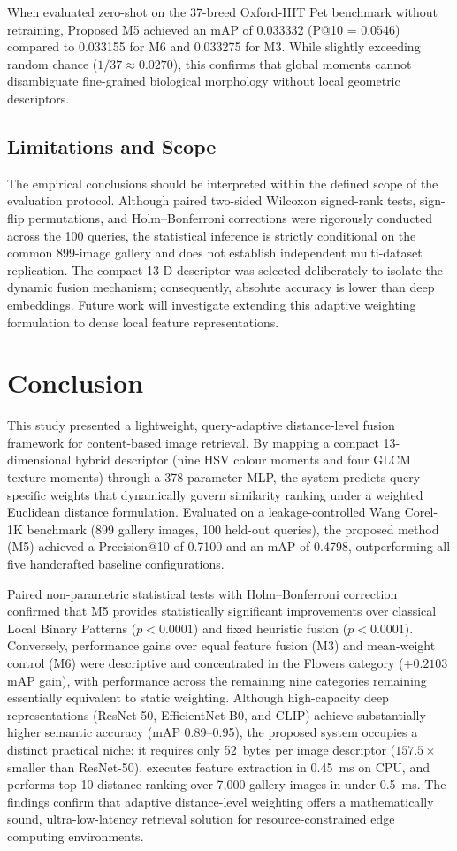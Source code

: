 \documentclass[pdflatex,sn-mathphys-num]{sn-jnl}
\begin{document}
When evaluated zero-shot on the 37-breed Oxford-IIIT Pet benchmark without retraining, Proposed M5 achieved an mAP of 0.033332 (P@10 = 0.0546) compared to 0.033155 for M6 and 0.033275 for M3. While slightly exceeding random chance ($1/37 \approx 0.0270$), this confirms that global moments cannot disambiguate fine-grained biological morphology without local geometric descriptors.

\subsection{Limitations and Scope}\label{subsec5.6}
The empirical conclusions should be interpreted within the defined scope of the evaluation protocol. Although paired two-sided Wilcoxon signed-rank tests, sign-flip permutations, and Holm--Bonferroni corrections were rigorously conducted across the 100 queries, the statistical inference is strictly conditional on the common 899-image gallery and does not establish independent multi-dataset replication. The compact 13-D descriptor was selected deliberately to isolate the dynamic fusion mechanism; consequently, absolute accuracy is lower than deep embeddings. Future work will investigate extending this adaptive weighting formulation to dense local feature representations.

\section{Conclusion}\label{sec6}
This study presented a lightweight, query-adaptive distance-level fusion framework for content-based image retrieval. By mapping a compact 13-dimensional hybrid descriptor (nine HSV colour moments and four GLCM texture moments) through a 378-parameter MLP, the system predicts query-specific weights that dynamically govern similarity ranking under a weighted Euclidean distance formulation. Evaluated on a leakage-controlled Wang Corel-1K benchmark (899 gallery images, 100 held-out queries), the proposed method (M5) achieved a Precision@10 of 0.7100 and an mAP of 0.4798, outperforming all five handcrafted baseline configurations.

Paired non-parametric statistical tests with Holm--Bonferroni correction confirmed that M5 provides statistically significant improvements over classical Local Binary Patterns ($p < 0.0001$) and fixed heuristic fusion ($p < 0.0001$). Conversely, performance gains over equal feature fusion (M3) and mean-weight control (M6) were descriptive and concentrated in the Flowers category ($+0.2103$ mAP gain), with performance across the remaining nine categories remaining essentially equivalent to static weighting. Although high-capacity deep representations (ResNet-50, EfficientNet-B0, and CLIP) achieve substantially higher semantic accuracy (mAP 0.89--0.95), the proposed system occupies a distinct practical niche: it requires only 52~bytes per image descriptor ($157.5\times$ smaller than ResNet-50), executes feature extraction in 0.45~ms on CPU, and performs top-10 distance ranking over 7,000 gallery images in under 0.5~ms. The findings confirm that adaptive distance-level weighting offers a mathematically sound, ultra-low-latency retrieval solution for resource-constrained edge computing environments.
\end{document}
